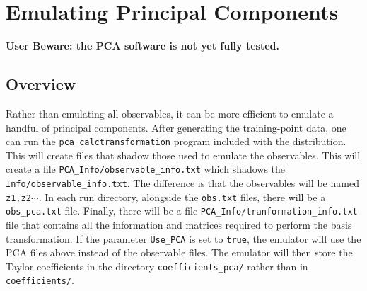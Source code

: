 \documentclass[UserManual.tex]{subfiles}
\begin{document}
\setcounter{section}{5}
\section{Emulating Principal Components}\label{sec:pca}

{\bf User Beware: the PCA software is not yet fully tested.}

\subsection{Overview}

Rather than emulating all observables, it can be more efficient to emulate a handful of principal components. After generating the training-point data, one can run the {\tt pca\_calctransformation} program included with the distribution. This will create files that shadow those used to emulate the observables. This will create a file {\tt PCA\_Info/observable\_info.txt} which shadows the  {\tt Info/observable\_info.txt}. The difference is that the observables will be named {\tt z1,z2}$\cdots$. In each run directory, alongside the {\tt obs.txt} files, there will be a {\tt obs\_pca.txt} file. Finally, there will be a file {\tt PCA\_Info/tranformation\_info.txt} file that contains all the information and matrices required to perform the basis transformation. If the parameter {\tt Use\_PCA} is set to {\tt true}, the emulator will use the PCA files above instead of the observable files. The emulator will then store the Taylor coefficients in the directory {\tt coefficients\_pca/} rather than in {\tt coefficients/}. 
\end{document}

